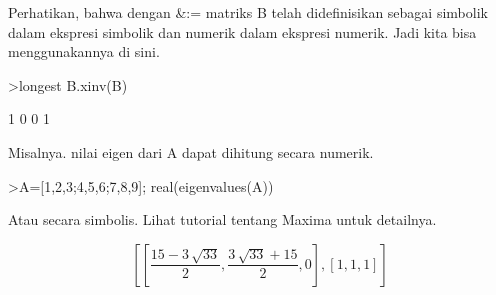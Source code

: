 \begin{eulernotebook}
\begin{eulercomment}
\begin{eulercomment}
\begin{eulercomment}
Perhatikan, bahwa dengan \&:= matriks B telah didefinisikan sebagai
simbolik dalam ekspresi simbolik dan numerik dalam ekspresi numerik.
Jadi kita bisa menggunakannya di sini.
\end{eulercomment}
\begin{eulerprompt}
>longest B.xinv(B)
\end{eulerprompt}
\begin{euleroutput}
                        1                       0 
                        0                       1 
\end{euleroutput}
\begin{eulercomment}
Misalnya. nilai eigen dari A dapat dihitung secara numerik.
\end{eulercomment}
\begin{eulerprompt}
>A=[1,2,3;4,5,6;7,8,9]; real(eigenvalues(A))
\end{eulerprompt}
\begin{euleroutput}
  [16.1168,  -1.11684,  0]
\end{euleroutput}
\begin{eulercomment}
Atau secara simbolis. Lihat tutorial tentang Maxima untuk detailnya.
\end{eulercomment}
\begin{eulerformula}
\[
\left[ \left[ \frac{15-3\,\sqrt{33}}{2} , \frac{3\,\sqrt{33}+15}{2}   , 0 \right]  , \left[ 1 , 1 , 1 \right]  \right] 
\]\\


\end{eulerformula}
\end{eulercomment}
\end{eulercomment}
\end{eulernotebook}

